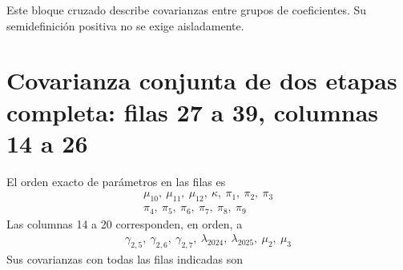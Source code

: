 \documentclass[11pt,a4paper]{article}
\begin{document}
Este bloque cruzado describe covarianzas entre grupos de coeficientes. Su semidefinición positiva no se exige aisladamente.

\clearpage
\section{Covarianza conjunta de dos etapas completa: filas 27 a 39, columnas 14 a 26}
El orden exacto de parámetros en las filas es
\[
\begin{gathered}\mu_10,\ \mu_11,\ \mu_12,\ \kappa,\ \pi_1,\ \pi_2,\ \pi_3\\\pi_4,\ \pi_5,\ \pi_6,\ \pi_7,\ \pi_8,\ \pi_9\end{gathered}
\]
Las columnas 14 a 20 corresponden, en orden, a
\[
\begin{gathered}\gamma_{2,5},\ \gamma_{2,6},\ \gamma_{2,7},\ \lambda_{2024},\ \lambda_{2025},\ \mu_2,\ \mu_3\end{gathered}
\]
Sus covarianzas con todas las filas indicadas son
\end{document}

